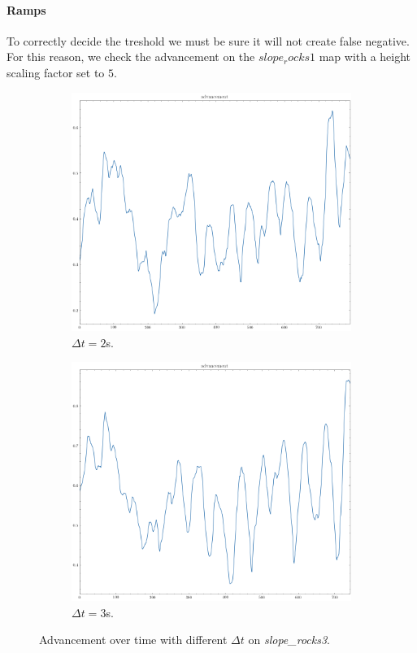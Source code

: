 \documentclass[../document.tex]{subfiles}
\begin{document}
\paragraph{Ramps}
To correctly decide the treshold we must be sure it will not create false negative. For this reason, we check the advancement on the $slope_rocks1$ map with a height scaling factor set to $5$.
\begin{figure}[H]
    \centering
    \begin{subfigure}[b]{0.45\textwidth}
        \includegraphics[width=\linewidth]{../img/3/find_tr/100-slope_rocks1}
        \caption{$\Delta t = 2$s.}
    \end{subfigure}
        \begin{subfigure}[b]{0.45\textwidth}
        \includegraphics[width=\linewidth]{../img/3/find_tr/150-slope_rocks1}
        \caption{$\Delta t = 3$s.}
    \end{subfigure}
    \caption{Advancement over time with different $\Delta t$ on \emph{slope\_rocks3}.}
\end{figure}
\end{document}
